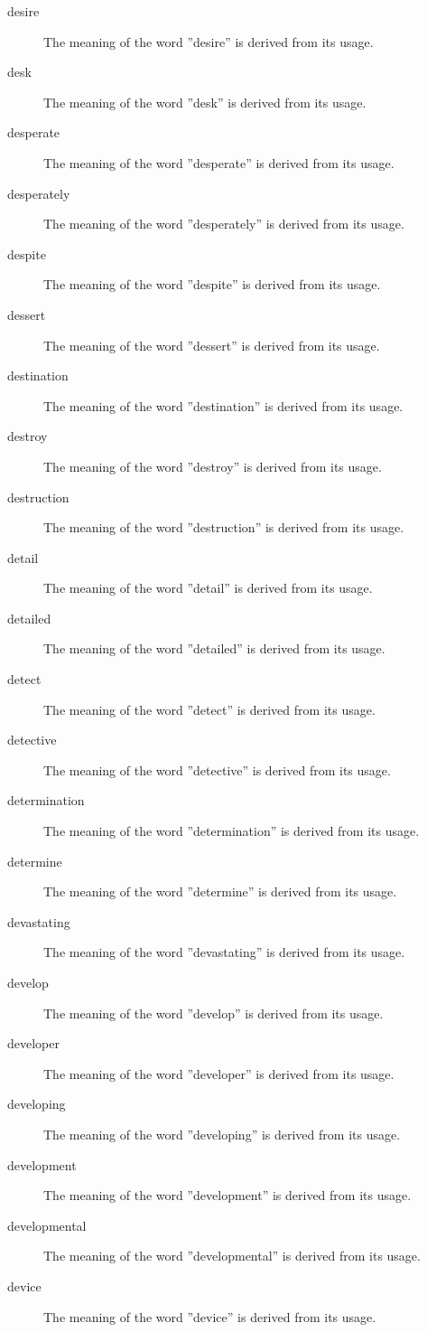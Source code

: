 \documentclass[12pt, letterpaper]{memoir}
\begin{document}
\begin{description}
\item[desire] The meaning of the word ''desire'' is derived from its usage.
\item[desk] The meaning of the word ''desk'' is derived from its usage.
\item[desperate] The meaning of the word ''desperate'' is derived from its usage.
\item[desperately] The meaning of the word ''desperately'' is derived from its usage.
\item[despite] The meaning of the word ''despite'' is derived from its usage.
\item[dessert] The meaning of the word ''dessert'' is derived from its usage.
\item[destination] The meaning of the word ''destination'' is derived from its usage.
\item[destroy] The meaning of the word ''destroy'' is derived from its usage.
\item[destruction] The meaning of the word ''destruction'' is derived from its usage.
\item[detail] The meaning of the word ''detail'' is derived from its usage.
\item[detailed] The meaning of the word ''detailed'' is derived from its usage.
\item[detect] The meaning of the word ''detect'' is derived from its usage.
\item[detective] The meaning of the word ''detective'' is derived from its usage.
\item[determination] The meaning of the word ''determination'' is derived from its usage.
\item[determine] The meaning of the word ''determine'' is derived from its usage.
\item[devastating] The meaning of the word ''devastating'' is derived from its usage.
\item[develop] The meaning of the word ''develop'' is derived from its usage.
\item[developer] The meaning of the word ''developer'' is derived from its usage.
\item[developing] The meaning of the word ''developing'' is derived from its usage.
\item[development] The meaning of the word ''development'' is derived from its usage.
\item[developmental] The meaning of the word ''developmental'' is derived from its usage.
\item[device] The meaning of the word ''device'' is derived from its usage.

\end{description}
\end{document}
